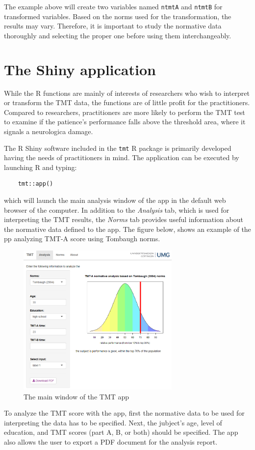 \documentclass[]{article}
\begin{document}
The example above will create two variables named \texttt{ntmtA} and \texttt{ntmtB} for transformed variables. Based on the norms used for the transformation, the results may vary. Therefore, it is important to study the normative data thoroughly and selecting the proper one before using them interchangeably. 


\section{The Shiny application}

While the R functions are mainly of interests of researchers who wish to interpret or transform the TMT data, the functions are of little profit for the practitioners. Compared to researchers, practitioners are more likely to perform the TMT test to examine if the patience's performance falls above the threshold area, where it signals a neurologica damage. 

The R Shiny software included in the \texttt{tmt} R package is primarily developed having the needs of practitioners in mind. The application can be executed by launching R and typing:


\begin{verbatim}
    tmt::app()
\end{verbatim}

which will launch the main analysis window of the app in the default web browser of the computer. In addition to the \textit{Analysis} tab, which is used for interpreting the TMT results, the \textit{Norms} tab provides useful information about the normative data defined to the app. The figure below, shows an example of the pp analyzing TMT-A score using Tombaugh \citeyear{tombaugh2004trail} norms.

\begin{figure}[ht!]
	\centering
	\includegraphics[width=80mm]{./Resources/app-main.png}
	\caption{The main window of the TMT app \label{overflow}}
\end{figure}

\break

To analyze the TMT score with the app, first the normative data to be used for interpreting the data has to be specified. Next, the jubject's age, level of education, and TMT scores (part A, B, or both) should be specified. The app also allows the user to export a PDF document for the analysis report. 





\end{document}
